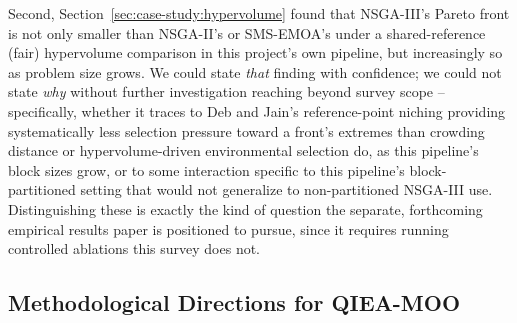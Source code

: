 Second, Section~\ref{sec:case-study:hypervolume} found that NSGA-III's
Pareto front is not only smaller than NSGA-II's or SMS-EMOA's under a
shared-reference (fair) hypervolume comparison in this project's own
pipeline, but increasingly so as problem size grows. We could state
\emph{that} finding with confidence; we could not state \emph{why}
without further investigation reaching beyond survey scope --
specifically, whether it traces to Deb and Jain's reference-point
niching providing systematically less selection pressure toward a
front's extremes than crowding distance or hypervolume-driven
environmental selection do, as this pipeline's block sizes grow, or to
some interaction specific to this pipeline's block-partitioned setting
that would not generalize to non-partitioned NSGA-III use. Distinguishing
these is exactly the kind of question the separate, forthcoming
empirical results paper is positioned to pursue, since it requires
running controlled ablations this survey does not.

\subsection{Methodological Directions for QIEA-MOO}
\label{sec:open-challenges:methodological}

